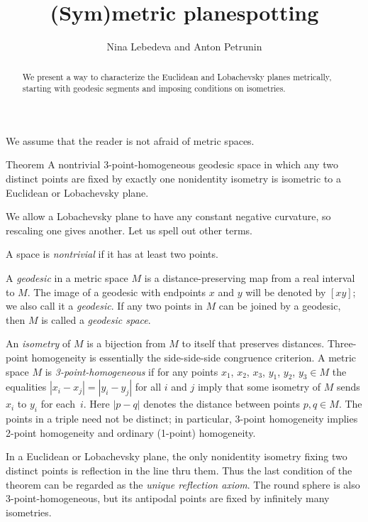 \documentclass[a4paper,10pt]{article}
\def\thetitle{(Sym)metric planespotting}
\def\theauthors{Nina Lebedeva and Anton Petrunin}
\begin{document}
\title{\thetitle}
\author{\theauthors}
\date{}
\maketitle

\begin{abstract}
We present a way to characterize the Euclidean and Lobachevsky planes metrically, starting with geodesic segments and imposing conditions on isometries.
\end{abstract}

We assume that the reader is not afraid of metric spaces.

\begin{thm}{Theorem}\label{thm:main}
A nontrivial 3-point-homogeneous geodesic space in which any two distinct points are fixed by exactly one nonidentity isometry is isometric to a Euclidean or Lobachevsky plane.
\end{thm}

We allow a Lobachevsky plane to have any constant negative curvature, so rescaling one gives another.
Let us spell out other terms.

A space is \emph{nontrivial} if it has at least two points.

A \emph{geodesic} in a metric space $M$ is a distance-preserving map from a real interval to $M$.
The image of a geodesic with endpoints $x$ and $y$ will be denoted by $[xy]$; we also call it a \emph{geodesic}.
If any two points in $M$ can be joined by a geodesic, then $M$ is called a \emph{geodesic space}.

An \emph{isometry} of $M$ is a bijection from $M$ to itself that preserves distances.
Three-point homogeneity is essentially the side-side-side congruence criterion.
A metric space $M$ is \emph{3-point-homogeneous} if for any points $x_1$, $x_2$, $x_3$, $y_1$, $y_2$, $y_3\in M$ the equalities $|x_i-x_j|=|y_i-y_j|$ for all $i$ and $j$ imply that some isometry of $M$ sends $x_i$ to $y_i$ for each~$i$.
Here $|p-q|$ denotes the distance between points $p,q\in M$.
The points in a triple need not be distinct; in particular, 3-point homogeneity implies 2-point homogeneity and ordinary (1-point) homogeneity.

In a Euclidean or Lobachevsky plane, the only nonidentity isometry fixing two distinct points is reflection in the line thru them.
Thus the last condition of the theorem can be regarded as the \emph{unique reflection axiom}.
The round sphere is also 3-point-homogeneous, but its antipodal points are fixed by infinitely many isometries.
\end{document}
